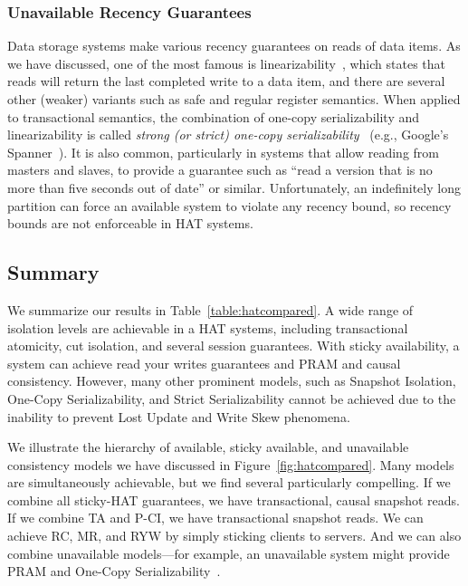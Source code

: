 \subsubsection{Unavailable Recency Guarantees}

Data storage systems make various recency guarantees on reads of data
items. As we have discussed, one of the most famous is
linearizability~\cite{herlihy-art}, which states that reads will
return the last completed write to a data item, and there are several
other (weaker) variants such as safe and regular register
semantics. When applied to transactional semantics, the combination of
one-copy serializability and linearizability is called \textit{strong
  (or strict) one-copy serializability}~\cite{adya} (e.g., Google's
Spanner~\cite{spanner}). It is also common, particularly in systems
that allow reading from masters and slaves, to provide a guarantee
such as ``read a version that is no more than five seconds out of
date'' or similar. Unfortunately, an indefinitely long partition can
force an available system to violate any recency bound, so recency
bounds are not enforceable in HAT systems.

\subsection{Summary}
\label{sec:hat-summary}

We summarize our results in Table~\ref{table:hatcompared}. A wide
range of isolation levels are achievable in a HAT systems, including
transactional atomicity, cut isolation, and several session
guarantees. With sticky availability, a system can achieve read your
writes guarantees and PRAM and causal consistency. However, many other
prominent models, such as Snapshot Isolation, One-Copy
Serializability, and Strict Serializability cannot be achieved due to
the inability to prevent Lost Update and Write Skew phenomena.

We illustrate the hierarchy of available, sticky available, and
unavailable consistency models we have discussed in
Figure~\ref{fig:hatcompared}. Many models are simultaneously
achievable, but we find several particularly compelling. If we combine
all sticky-HAT guarantees, we have transactional, causal snapshot
reads. If we combine TA and P-CI, we have transactional snapshot
reads. We can achieve RC, MR, and RYW by simply sticking clients to
servers. And we can also combine unavailable models---for example, an
unavailable system might provide PRAM and One-Copy
Serializability~\cite{daudjee-session}.

